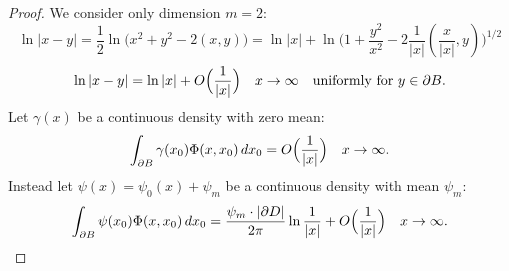 \documentclass[10pt, a4paper, twoside, openright]{book}
\theoremstyle{definition}
\theoremstyle{plain}
\theoremstyle{plain}
\theoremstyle{plain}
\theoremstyle{plain}
\theoremstyle{plain}
\theoremstyle{plain}
\theoremstyle{plain}
\theoremstyle{plain}
\begin{document}
\begin{proof} We consider only dimension $m=2$:
 \begin{equation}
  \ln|x-y|=\frac{1}{2}\ln\Big(x^2 + y^2 - 2 (x,y)\Big) = \ln|x| + \ln\Big(1+\frac{y^2}{x^2}-2\frac{1}{|x|}(\frac{x}{|x|},y)\Big)^{1/2}
 \end{equation}
 \begin{equation}
  \ln|x-y|=\ln|x|+O\Bigl(\frac{1}{|x|}\Bigr) \quad x\to\infty\quad \text{uniformly for }y\in\partial B.
 \end{equation}
 Let $\gamma(x)$ be a continuous density with zero mean:
 \begin{equation}
  \int_{\partial B}\gamma(x_0)\Phi(x,x_0)\, dx_0 = O\Bigl(\frac{1}{|x|}\Bigr)\quad x\to\infty.
 \end{equation}
 Instead let $\psi(x)=\psi_0(x)+\psi_m$ be a continuous density with mean $\psi_m$:
 \begin{equation}
  \int_{\partial B}\psi(x_0)\Phi(x,x_0)\, dx_0 = \dfrac{\psi_m\cdot |\partial D|}{2\pi}\ln\dfrac{1}{|x|} + O\Bigl(\frac{1}{|x|}\Bigr)\quad x\to\infty.
 \end{equation}
\end{proof}
\end{document}

